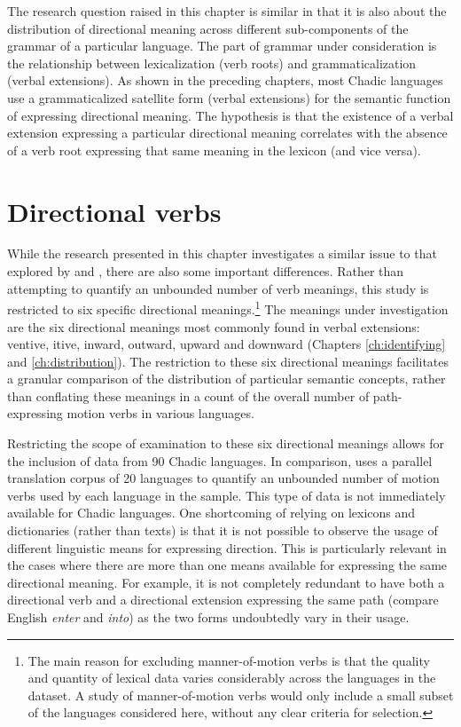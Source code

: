 The research question raised in this chapter is similar in that it is also about the distribution of directional meaning across different sub-components of the grammar of a particular language. The part of grammar under consideration is the relationship between lexicalization (verb roots) and grammaticalization (verbal extensions). As shown in the preceding chapters, most Chadic languages use a grammaticalized satellite form (verbal extensions) for the semantic function of expressing directional meaning. The hypothesis is that the existence of a verbal extension expressing a particular directional meaning correlates with the absence of a verb root expressing that same meaning in the lexicon (and vice versa). 

\section{Directional verbs} \label{sec:motionverbs}

While the research presented in this chapter investigates a similar issue to that explored by \citet{slobinMindCodeText1997} and \citet{verkerkEvolutionaryDynamicsMotion2014}, there are also some important differences. Rather than attempting to quantify an unbounded number of verb meanings, this study is restricted to six specific directional meanings.\footnote{The main reason for excluding manner-of-motion verbs is that the quality and quantity of lexical data varies considerably across the languages in the dataset. A study of manner-of-motion verbs would only include a small subset of the languages considered here, without any clear criteria for selection.} The meanings under investigation are the six directional meanings most commonly found in verbal extensions: ventive, itive, inward, outward, upward and downward (Chapters \ref{ch:identifying} and \ref{ch:distribution}). The restriction to these six directional meanings facilitates a granular comparison of the distribution of particular semantic concepts, rather than conflating these meanings in a count of the overall number of path-expressing motion verbs in various languages. 

Restricting the scope of examination to these six directional meanings allows for the inclusion of data from 90 Chadic languages. In comparison, \citet{verkerkEvolutionaryDynamicsMotion2014} uses a parallel translation corpus of 20 languages to quantify an unbounded number of motion verbs used by each language in the sample. This type of data is not immediately available for Chadic languages. One shortcoming of relying on lexicons and dictionaries (rather than texts) is that it is not possible to observe the usage of different linguistic means for expressing direction. This is particularly relevant in the cases where there are more than one means available for expressing the same directional meaning. For example, it is not completely redundant to have both a directional verb and a directional extension expressing the same path (compare English \textit{enter} and \textit{into}) as the two forms undoubtedly vary in their usage.

